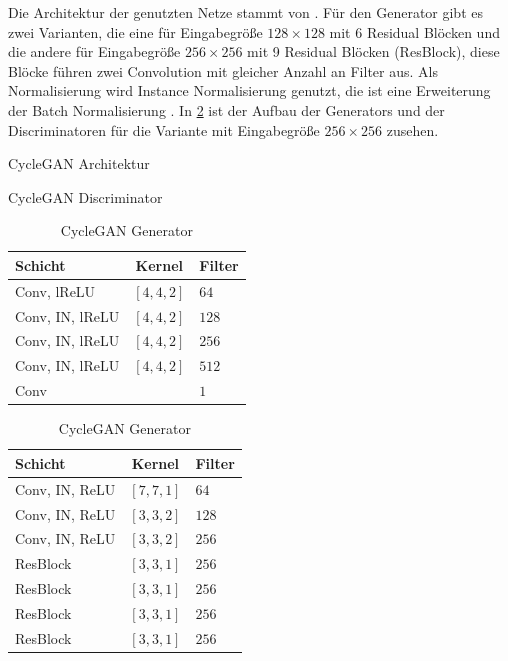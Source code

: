  Die Architektur der genutzten Netze stammt von \citeauthor{johnson_perceptual_2016} \cite{johnson_perceptual_2016}. Für den Generator gibt es zwei Varianten, die eine für Eingabegröße $128 \times 128$ mit 6 Residual Blöcken und die andere für Eingabegröße $256 \times 256$ mit 9 Residual Blöcken (ResBlock), diese Blöcke führen zwei Convolution mit gleicher Anzahl an Filter aus. Als Normalisierung wird Instance Normalisierung genutzt, die ist eine Erweiterung der Batch Normalisierung \cite{ulyanov_instance_2016}. In \cref{tab:cycleGAN} ist der Aufbau der Generators und der Discriminatoren für die Variante mit Eingabegröße $256 \times 256$ zusehen.
 
 \begin{table}[]
 	\caption{CycleGAN Architektur}
 	\label{tab:cycleGAN}
 	\begin{center}
 		\begin{minipage}{.5\linewidth}
 			\caption{CycleGAN Discriminator}
 			\centering
 			\begin{tabular}{lcl}
 				\toprule
 				Schicht & Kernel & Filter\\
 				\toprule
 				Conv, lReLU & $[4,4,2]$ & $64$\\
 				\midrule
 				Conv, IN, lReLU & $[4,4,2]$ & $128$\\
 				\midrule
 				Conv, IN, lReLU & $[4,4,2]$ & $256$\\
 				\midrule
 				Conv, IN, lReLU & $[4,4,2]$ & $512$\\
 				\midrule
 				Conv & &$1$\\
 				\bottomrule
 			\end{tabular}
 		\end{minipage}%
 		\begin{minipage}{.5\linewidth}
 			\centering
 			\caption{CycleGAN Generator}
 			\begin{tabular}{lcl}
 				\toprule
 				Schicht & Kernel & Filter\\
 				\toprule
 				Conv, IN, ReLU & $[7,7,1]$ & $64$\\
 				\midrule
 				Conv, IN, ReLU & $[3,3,2]$ & $128$\\
 				\midrule
 				Conv, IN, ReLU & $[3,3,2]$ & $256$\\
 				\midrule
 				ResBlock & $[3,3,1]$& $256$ \\
 				\midrule
 				ResBlock & $[3,3,1]$& $256$ \\
 				\midrule
 				ResBlock & $[3,3,1]$& $256$ \\
 				\midrule
 				ResBlock & $[3,3,1]$& $256$ \\

\end{tabular}
\end{minipage}
\end{center}
\end{table}
